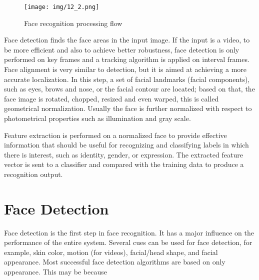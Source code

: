 \documentclass[12pt, twoside]{report}
\begin{document}
	\begin{figure}[h]
    	\centering
    	\texttt{[image: img/12\_2.png]}
    	\caption{Face recognition processing flow}
    	\label{fig:processingFlow}
	\end{figure}

	Face detection finds the face areas in the input image. If the input is a video, to be more efficient and also to achieve better robustness, face detection is only performed on key frames and a tracking algorithm is applied on interval frames. Face alignment is very similar to detection, but it is aimed at achieving a more accurate localization. In this step, a set of facial landmarks (facial components), such as eyes, brows and nose, or the facial contour are located; based on that, the face image is rotated, chopped, resized and even warped, this is called geometrical normalization. Usually the face is further normalized with respect to photometrical properties such as illumination and gray scale.

	Feature extraction is performed on a normalized face to provide effective information that should be useful for recognizing and classifying labels in which there is interest, such as identity, gender, or expression. The extracted feature vector is sent to a classifier and compared with the training data to produce a recognition output.

	\section{Face Detection}
	Face detection is the first step in face recognition. It has a major influence on the performance of the entire system. Several cues can be used for face detection, for example, skin color, motion (for videos), facial/head shape, and facial appearance. Most successful face detection algorithms are based on only appearance. This may be because

	\newpage
	
\end{document}
